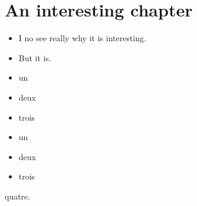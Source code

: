 \chapter{An interesting chapter}
\label{s:1}
\begin{itemize}
\item I no see really why it is interesting.
\item But it is.
\end{itemize}
\begin{itemize}
\item un
\item deux
\item trois
\end{itemize}

\begin{itemize}
\item un
\item deux
\item trois
\end{itemize}
quatre.

